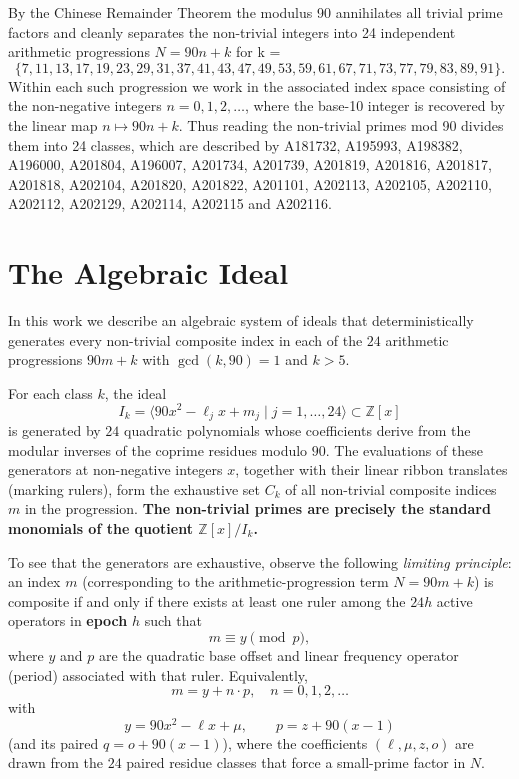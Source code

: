 \documentclass[11pt,a4paper]{article}
\begin{document}
By the Chinese Remainder Theorem the modulus 90 annihilates all trivial prime factors and cleanly separates the non-trivial integers into 24 independent arithmetic progressions \(N=90n+k\) for k = 
\[
\{7,11,13,17,19,23,29,31,37,41,43,47,49,53,59,61,67,71,73,77,79,83,89,91\}.
\]
Within each such progression we work in the associated index space consisting of the non-negative integers \(n=0,1,2,\dots\), where the base-10 integer is recovered by the linear map \(n\mapsto90n+k\). Thus reading the non-trivial primes mod 90 divides them into 24 classes, which are described by A181732, A195993,
A198382, A196000, A201804, A196007, A201734, A201739, A201819, A201816,
A201817, A201818, A202104, A201820, A201822, A201101, A202113, A202105,
A202110, A202112, A202129, A202114, A202115 and A202116. 




\section{The Algebraic Ideal}

In this work we describe an algebraic system of ideals that deterministically generates every non-trivial composite index in each of the $24$ arithmetic progressions $90m+k$ with $\gcd(k,90)=1$ and $k>5$.

For each class $k$, the ideal
\[
I_k=\langle 90x^2-\ell_j x+m_j\mid j=1,\dots,24\rangle\subset\mathbb{Z}[x]
\]
is generated by $24$ quadratic polynomials whose coefficients derive from the modular inverses of the coprime residues modulo $90$. The evaluations of these generators at non-negative integers $x$, together with their linear ribbon translates (marking rulers), form the exhaustive set $C_k$ of all non-trivial composite indices $m$ in the progression.\textbf{ The non-trivial primes are precisely the standard monomials of the quotient $\mathbb{Z}[x]/I_k$. }

To see that the generators are exhaustive, observe the following \emph{limiting principle}: an index $m$ (corresponding to the arithmetic-progression term $N=90m+k$) is composite if and only if there exists at least one ruler among the $24h$ active operators in \textbf{epoch} $h$ such that
\[
m \equiv y \pmod{p},
\]
where $y$ and $p$ are the quadratic base offset and linear frequency operator (period) associated with that ruler. Equivalently,
\[
m = y + n\cdot p, \quad n=0,1,2,\dots
\]
with
\[
y = 90x^2 - \ell x + \mu, \qquad p = z + 90(x-1)
\]
(and its paired $q = o + 90(x-1)$), where the coefficients $(\ell,\mu,z,o)$ are drawn from the $24$ paired residue classes that force a small-prime factor in $N$.
\end{document}
